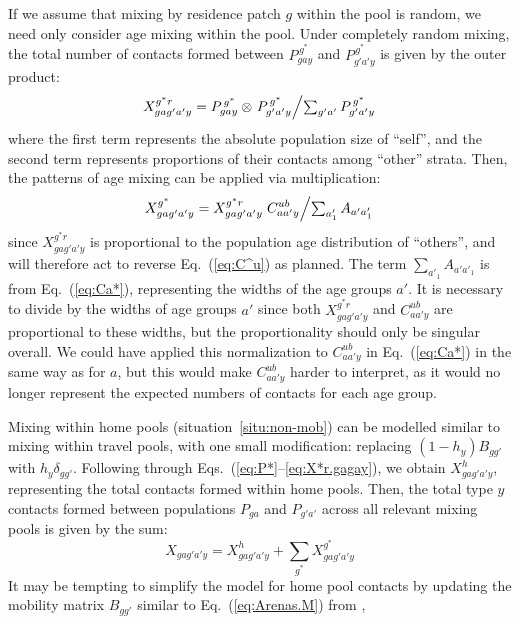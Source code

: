 If we assume that mixing by residence patch $g$ within the pool is random,
we need only consider age mixing within the pool.
Under completely random mixing,
the total number of contacts formed between $P^{\,g^*}_{gay}$ and $P^{\,g^*}_{g'a'y}$
is given by the outer product:
\begin{equation}\label{eq:X*r.gagay}
  X^{g^*r}_{gag'a'y} = P^{\,g^*}_{gay} \otimes
    \left. P^{\,g^*}_{g'a'y} \middle/ \textstyle\sum_{g'a'} P^{\,g^*}_{g'a'y}\right.
\end{equation}
where the first term represents the absolute population size of ``self'',
and the second term represents proportions of their contacts among ``other'' strata.
Then, the patterns of age mixing can be applied via multiplication:
\begin{equation}\label{eq:X*.gagay}
  X^{g^*}_{gag'a'y} = X^{g^*r}_{gag'a'y}
    \left.C^{ub}_{aa'y} \middle/ \textstyle\sum_{a'_1} A_{a'a'_1}\right.
\end{equation}
since $X^{g^*r}_{gag'a'y}$ is proportional to the population age distribution of ``others'',
and will therefore act to reverse Eq.~(\ref{eq:C^u}) as planned.
The term $\sum_{a'_1} A_{a'a'_1}$ is from Eq.~(\ref{eq:Ca*}),
representing the widths of the age groups $a'$.
It is necessary to divide by the widths of age groups $a'$ since
both $X^{g^*r}_{gag'a'y}$ and $C^{ub}_{aa'y}$ are proportional to these widths,
but the proportionality should only be singular overall.
We could have applied this normalization to $C^{ub}_{aa'y}$
in Eq.~(\ref{eq:Ca*}) in the same way as for $a$,
but this would make $C^{ub}_{aa'y}$ harder to interpret,
as it would no longer represent the expected numbers of contacts for each age group.
\par
Mixing within home pools (situation~\ref{situ:non-mob})
can be modelled similar to mixing within travel pools,
with one small modification: replacing $(1-h_y) B_{gg'}$ with $h_y \delta_{gg'}$.
Following through Eqs.~(\ref{eq:P*}--\ref{eq:X*r.gagay}), we obtain $X^{h}_{gag'a'y}$,
representing the total contacts formed within home pools.
Then, the total type $y$ contacts formed between populations $P_{ga}$ and $P_{g'a'}$
across all relevant mixing pools is given by the sum:
\begin{equation}\label{eq:Xgagay}
  X_{gag'a'y} = X^h_{gag'a'y} + \sum_{g^*} X^{g^*}_{gag'a'y}
\end{equation}
It may be tempting to simplify the model for home pool contacts by
updating the mobility matrix $B_{gg'}$ similar to Eq.~(\ref{eq:Arenas.M}) from \cite{Arenas2020},
